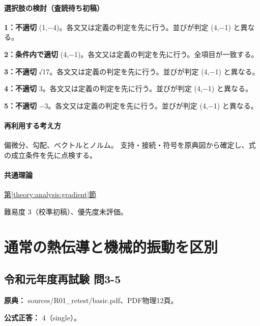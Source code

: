 \paragraph{選択肢の検討（査読待ち初稿）}\mbox{}\par

\noindent\textbf{1：不適切} (1,−4)。各文又は定義の判定を先に行う。並びが判定 (4,−1) と異なる。\par

\noindent\textbf{2：条件内で適切} (4,−1)。各文又は定義の判定を先に行う。全項目が一致する。\par

\noindent\textbf{3：不適切} √17。各文又は定義の判定を先に行う。並びが判定 (4,−1) と異なる。\par

\noindent\textbf{4：不適切} 3。各文又は定義の判定を先に行う。並びが判定 (4,−1) と異なる。\par

\noindent\textbf{5：不適切} −3。各文又は定義の判定を先に行う。並びが判定 (4,−1) と異なる。\par

\paragraph{再利用する考え方} 偏微分、勾配、ベクトルとノルム。 支持・接続・符号を原典図から確定し、式の成立条件を先に点検する。

\paragraph{共通理論} \hyperref[theory:analysis:gradient]{第\ref*{theory:analysis:gradient}節}

\par 難易度 3（校準初稿）、優先度未評価。

\section{通常の熱伝導と機械的振動を区別}

\subsection{令和元年度再試験 問3-5}
\label{q:r01-ret-basic-3-5}

\noindent\textbf{原典：} sources/R01\_retest/basic.pdf、PDF物理12頁。

\textbf{公式正答：} 4（single）。

